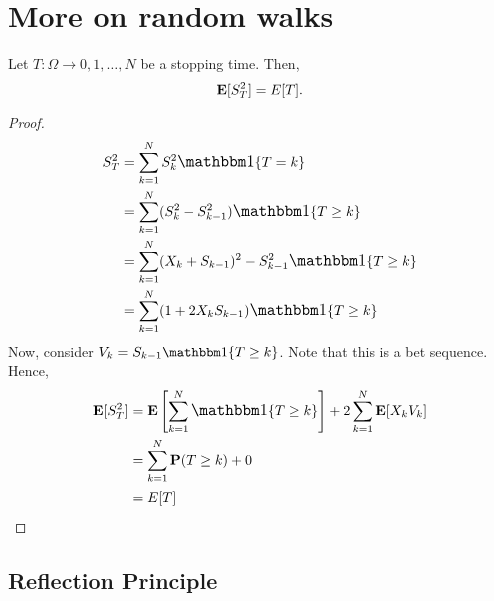 \documentclass[main]{subfiles}
\begin{document}
\setcounter{chapter}{1} %
\chapter{More on random walks} %
\setcounter{section}{0}


\begin{theorem}
    Let $T:\Omega\rightarrow{0,1,\ldots,N}$ be a stopping time. Then,
    $$\mathbf E[S_T^2]=E[T].$$
\end{theorem}
\begin{proof}
    $$
        \begin{aligned}
            S_T^2 & =\sum_{k=1}^N S_k^2 \one\{T=k\}                         \\
                  & =\sum_{k=1}^N (S_k^2-S_{k-1}^2) \one\{T\geq k\}         \\
                  & =\sum_{k=1}^N (X_k+S_{k-1})^2-S_{k-1}^2 \one\{T\geq k\} \\
                  & =\sum_{k=1}^N (1+2X_kS_{k-1}) \one\{T\geq k\}           \\
        \end{aligned}
    $$
    Now, consider $V_k=S_{k-1} \one\{T\geq k\}$. Note that this is a bet sequence. Hence,
    $$
        \begin{aligned}
            \E[S_T^2] & =\E\left[\sum_{k=1}^N\one\{T\geq k\}\right]+2\sum_{k=1}^N\E[X_k V_k] \\
                      & =\sum_{k=1}^N \P(T\geq k)+0                                          \\
                      & =E[T]
        \end{aligned}
    $$
\end{proof}


\section{Reflection Principle}
\end{document}
